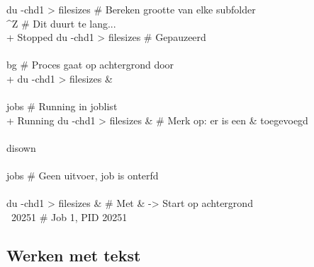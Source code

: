 \begin{bash}
\userprompt[~] du -chd1  > filesizes                    \# Bereken grootte van elke subfolder\\
\textasciicircum Z                                                     \# Dit duurt te lang...\\
\rbrack +  Stopped                 du -chd1 > filesizes     \# Gepauzeerd\\
\\
\userprompt[~] bg                                       \# Proces gaat op achtergrond door\\
\rbrack + du -chd1 > filesizes \&\\
\\
\userprompt[~] jobs                                     \# Running in joblist\\
\rbrack +  Running                 du -chd1 > filesizes \&   \# Merk op: er is een \& toegevoegd\\
\\
\userprompt[~] disown\\
\\
\userprompt[~] jobs                                     \# Geen uitvoer, job is onterfd\\
\\
\userprompt[~] du -chd1  > filesizes \&                  \# Met \& -> Start op achtergrond\\
\rbrack \ 20251                                              \# Job 1, PID 20251\\
\end{bash}

\subsection{Werken met tekst}\label{werken-met-tekst}

